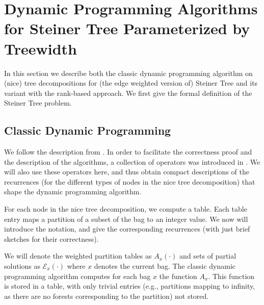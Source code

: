 \documentclass{llncs}
\begin{document}
\section{Dynamic Programming Algorithms for Steiner Tree Parameterized by Treewidth}\label{theory}
In this section we describe both the classic dynamic programming algorithm on (nice) tree
decompositions for (the edge weighted version of)
{\sc Steiner Tree} and its variant with the rank-based approach. We first give the formal definition of the {\sc Steiner Tree} problem.

\smallskip

\noindent
{}

\subsection{Classic Dynamic Programming}\label{fldp}
We follow the description from \cite{BodlaenderCKN12}. In order to facilitate the correctness proof and the description of the algorithms, a collection of operators was introduced in \cite{BodlaenderCKN12}.
We will also use these operators here, and thus obtain compact descriptions of the recurrences (for the different types of nodes in the
nice tree decomposition) that shape the dynamic programming algorithm.

For each node in the nice tree decomposition, we compute a table. Each table entry maps a partition of a subset of the bag to an integer value. 
We now will introduce the notation, and give the corresponding recurrences (with just brief sketches for their correctness).

We will denote the weighted partition tables as $A_{x}(\cdot)$ and sets of partial solutions as $\mathcal{E}_{x}(\cdot)$ where $x$ denotes the current bag. 
The classic dynamic programming algorithm computes for each bag $x$ the function $A_{x}$. This function is stored in a table, with only trivial
entries (e.g., partitions mapping to infinity, as there are no forests corresponding to the partition) not stored.
\end{document}
